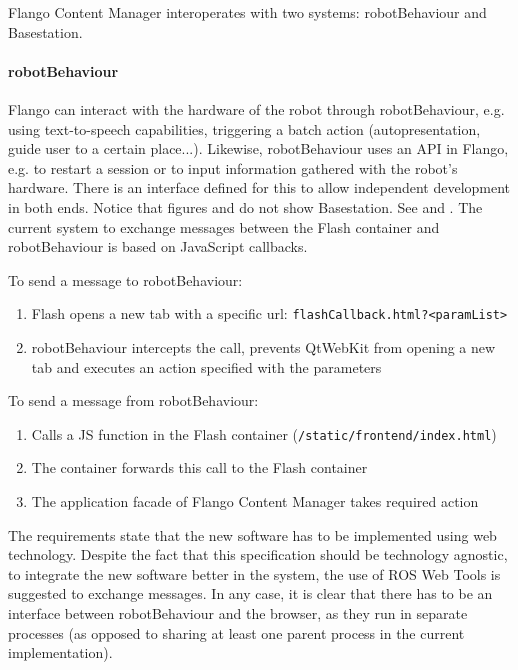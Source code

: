 Flango Content Manager interoperates with two systems: robotBehaviour and Basestation.

\paragraph{robotBehaviour} Flango can interact with the hardware of the robot through robotBehaviour, e.g. using text-to-speech capabilities, triggering a batch action (autopresentation, guide user to a certain place...).
Likewise, robotBehaviour uses an API in Flango, e.g. to restart a session or to input information gathered with the robot's hardware.
There is an interface defined for this to allow independent development in both ends.
Notice that figures  and  do not show Basestation. See  and .
The current system to exchange messages between the Flash container and robotBehaviour is based on JavaScript callbacks.

To send a message to robotBehaviour:
\begin{enumerate}
    \item Flash opens a new tab with a specific url: \texttt{flashCallback.html?\textless paramList\textgreater}
    \item robotBehaviour intercepts the call, prevents QtWebKit from opening a new tab and executes an action specified with the parameters
\end{enumerate}

To send a message from robotBehaviour:
\begin{enumerate}
    \item Calls a \ac{JS} function in the Flash container (\texttt{/static/frontend/index.html})
    \item The container forwards this call to the Flash container
    \item The application facade of Flango Content Manager takes required action
\end{enumerate}

The requirements state that the new software has to be implemented using web technology. 
Despite the fact that this specification should be technology agnostic, to integrate the new software better in the system, the use of ROS Web Tools is suggested to exchange messages.
In any case, it is clear that there has to be an interface between robotBehaviour and the browser, as they run in separate processes (as opposed to sharing at least one parent process in the current implementation).

